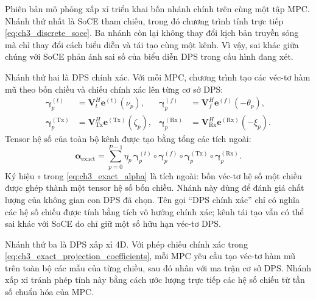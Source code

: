 Phiên bản mô phỏng xấp xỉ triển khai bốn nhánh chính trên cùng một tập MPC. Nhánh thứ nhất là SoCE tham chiếu, trong đó chương trình tính trực tiếp \eqref{eq:ch3_discrete_soce}. Ba nhánh còn lại không thay đổi kịch bản truyền sóng mà chỉ thay đổi cách biểu diễn và tái tạo cùng một kênh. Vì vậy, sai khác giữa chúng với SoCE phản ánh sai số của biểu diễn DPS trong cấu hình đang xét.

Nhánh thứ hai là DPS chính xác. Với mỗi MPC, chương trình tạo các véc-tơ hàm mũ theo bốn chiều và chiếu chính xác lên từng cơ sở DPS:
\begin{equation}
\begin{aligned}
\boldsymbol{\gamma}^{(t)}_p
&=\mathbf{V}_t^{H}\mathbf{e}^{(t)}(\nu_p),&
\boldsymbol{\gamma}^{(f)}_p
&=\mathbf{V}_f^{H}\mathbf{e}^{(f)}(-\theta_p),\\
\boldsymbol{\gamma}^{(\mathrm{Tx})}_p
&=\mathbf{V}_{\mathrm{Tx}}^{H}\mathbf{e}^{(\mathrm{Tx})}(\zeta_p),&
\boldsymbol{\gamma}^{(\mathrm{Rx})}_p
&=\mathbf{V}_{\mathrm{Rx}}^{H}\mathbf{e}^{(\mathrm{Rx})}(-\xi_p).
\end{aligned}
\label{eq:ch3_exact_projection_coefficients}
\end{equation}
Tensor hệ số của toàn bộ kênh được tạo bằng tổng các tích ngoài:
\begin{equation}
\boldsymbol{\alpha}_{\mathrm{exact}}
=
\sum_{p=0}^{P-1}
\eta_p\,
\boldsymbol{\gamma}^{(t)}_p
\circ
\boldsymbol{\gamma}^{(f)}_p
\circ
\boldsymbol{\gamma}^{(\mathrm{Tx})}_p
\circ
\boldsymbol{\gamma}^{(\mathrm{Rx})}_p.
\label{eq:ch3_exact_alpha}
\end{equation}
Ký hiệu \(\circ\) trong \eqref{eq:ch3_exact_alpha} là tích ngoài: bốn véc-tơ hệ số một chiều được ghép thành một tensor hệ số bốn chiều. Nhánh này dùng để đánh giá chất lượng của không gian con DPS đã chọn. Tên gọi ``DPS chính xác'' chỉ có nghĩa các hệ số chiếu được tính bằng tích vô hướng chính xác; kênh tái tạo vẫn có thể sai khác với SoCE do chỉ giữ một số hữu hạn véc-tơ DPS.

Nhánh thứ ba là DPS xấp xỉ 4D. Với phép chiếu chính xác trong \eqref{eq:ch3_exact_projection_coefficients}, mỗi MPC yêu cầu tạo véc-tơ hàm mũ trên toàn bộ các mẫu của từng chiều, sau đó nhân với ma trận cơ sở DPS. Nhánh xấp xỉ tránh phép tính này bằng cách ước lượng trực tiếp các hệ số chiếu từ tần số chuẩn hóa của MPC.

